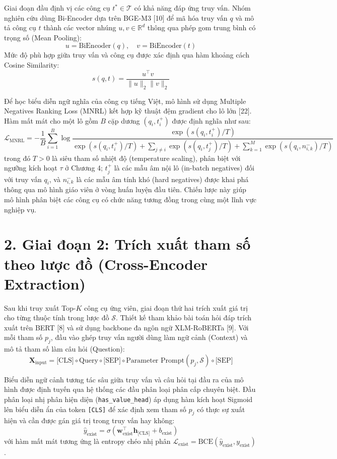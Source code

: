 Giai đoạn đầu định vị các công cụ $t^* \in \mathcal{T}$ có khả năng đáp ứng truy vấn. Nhóm nghiên cứu dùng Bi-Encoder dựa trên BGE-M3 [10] để mã hóa truy vấn $q$ và mô tả công cụ $t$ thành các vector nhúng $u, v \in \mathbb{R}^d$ thông qua phép gom trung bình có trọng số (Mean Pooling):
$$u = \text{BiEncoder}(q), \quad v = \text{BiEncoder}(t)$$
Mức độ phù hợp giữa truy vấn và công cụ được xác định qua hàm khoảng cách Cosine Similarity:
$$s(q, t) = \frac{u^\top v}{\|u\|_2 \|v\|_2}$$

Để học biểu diễn ngữ nghĩa của công cụ tiếng Việt, mô hình sử dụng Multiple Negatives Ranking Loss (MNRL) kết hợp kỹ thuật đệm gradient cho lô lớn [22]. Hàm mất mát cho một lô gồm $B$ cặp dương $(q_i, t_i^+)$ được định nghĩa như sau:
$$\mathcal{L}_{\text{MNRL}} = -\frac{1}{B} \sum_{i=1}^B \log \frac{\exp\left(s(q_i, t_i^+) / T\right)}{\exp\left(s(q_i, t_i^+) / T\right) + \sum_{j \neq i} \exp\left(s(q_i, t_j^+) / T\right) + \sum_{k=1}^{M} \exp\left(s(q_i, n_{i,k}^-) / T\right)}$$
trong đó $T>0$ là siêu tham số nhiệt độ (temperature scaling), phân biệt với ngưỡng kích hoạt $\tau$ ở Chương 4; $t_j^+$ là các mẫu âm nội lô (in-batch negatives) đối với truy vấn $q_i$, và $n_{i,k}^-$ là các mẫu âm tính khó (hard negatives) được khai phá thông qua mô hình giáo viên ở vòng huấn luyện đầu tiên. Chiến lược này giúp mô hình phân biệt các công cụ có chức năng tương đồng trong cùng một lĩnh vực nghiệp vụ.

\section{2. Giai đoạn 2: Trích xuất tham số theo lược đồ (Cross-Encoder Extraction)}

Sau khi truy xuất Top-$K$ công cụ ứng viên, giai đoạn thứ hai trích xuất giá trị cho từng thuộc tính trong lược đồ $\mathcal{S}$. Thiết kế tham khảo bài toán hỏi đáp trích xuất trên BERT [8] và sử dụng backbone đa ngôn ngữ XLM-RoBERTa [9]. Với mỗi tham số $p_j$, đầu vào ghép truy vấn người dùng làm ngữ cảnh (Context) và mô tả tham số làm câu hỏi (Question):
$$\mathbf{X}_{\text{input}} = \text{[CLS]} \circ \text{Query} \circ \text{[SEP]} \circ \text{Parameter Prompt}(p_j, \mathcal{S}) \circ \text{[SEP]}$$

Biểu diễn ngữ cảnh tương tác sâu giữa truy vấn và câu hỏi tại đầu ra của mô hình được định tuyến qua hệ thống các đầu phân loại phân cấp chuyên biệt. Đầu phân loại nhị phân hiện diện (\texttt{has_value_head}) áp dụng hàm kích hoạt Sigmoid lên biểu diễn ẩn của token \texttt{[CLS]} để xác định xem tham số $p_j$ có thực sự xuất hiện và cần được gán giá trị trong truy vấn hay không:
$$\hat{y}_{\text{exist}} = \sigma\left(\mathbf{w}_{\text{exist}}^\top \mathbf{h}_{\text{[CLS]}} + b_{\text{exist}}\right)$$
với hàm mất mát tương ứng là entropy chéo nhị phân $\mathcal{L}_{\text{exist}} = \text{BCE}(\hat{y}_{\text{exist}}, y_{\text{exist}})$.

